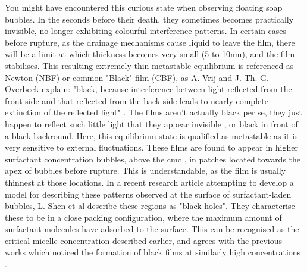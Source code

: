 \documentclass[a4paper,12pt]{article}
\numberwithin{equation}{section}
\numberwithin{figure}{section}
\numberwithin{table}{section}
\begin{document}
You might have encountered this curious state when observing floating soap bubbles. In the seconds before their death, they sometimes becomes practically invisible, no longer exhibiting colourful interference patterns. In certain cases before rupture, as the drainage mechanisms cause liquid to leave the film, there will be a limit at which thickness becomes very small (5 to 10nm), and the film stabilises. This resulting extremely thin metastable equilibrium is referenced as Newton (NBF) or common "Black" film (CBF), as A. Vrij and J. Th. G. Overbeek explain: "black, because interference between light reflected from the front side and that reflected from the back side leads to nearly complete extinction of the reflected light" \cite{Vrij1968}. The films aren't actually black per se, they just happen to reflect such little light that they appear invisible \cite{Langevin1994}, or black in front of a black backround. Here, this equilibrium state is qualified as metastable as it is very sensitive to external fluctuations. These films are found to appear in higher surfactant concentration bubbles, above the cmc \cite{Bhamla2017, Manev1974}, in patches located towards the apex of bubbles before rupture. This is understandable, as the film is usually thinnest at those locations. In a recent research article attempting to develop a model for describing these patterns observed at the surface of surfactant-laden bubbles, L. Shen et al \cite{Shen2020} describe these regions as "black holes". They characterise these to be in a close packing configuration, where the maximum amount of surfactant molecules have adsorbed to the surface. This can be recognised as the critical micelle concentration described earlier, and agrees with the previous works which noticed the formation of black films at similarly high concentrations \cite{Bhamla2017, Manev1974}.
\end{document}
